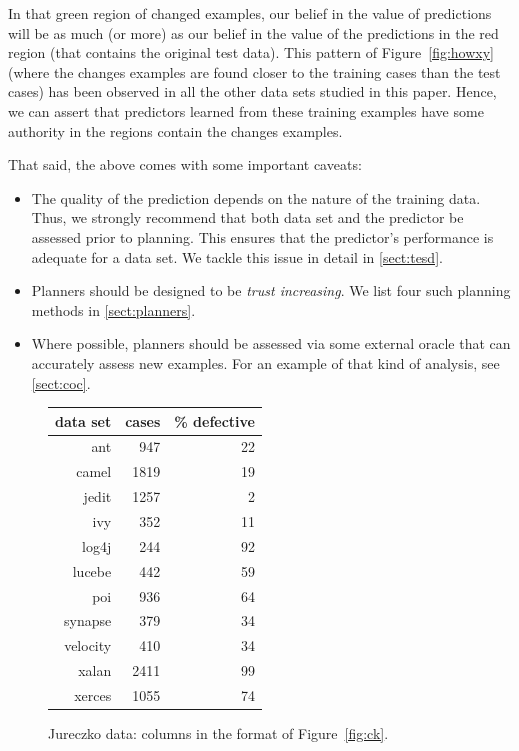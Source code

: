 \documentclass{sig-alternate}
\newcommand{\bi}{\begin{itemize}}
\newcommand{\ei}{\end{itemize}}
\newcommand{\tion}[1]{\textsection\ref{sect:#1}}
\newcommand{\fig}[1]{Figure~\ref{fig:#1}}
\begin{document}
In that green region of changed examples, our belief in the value of predictions
will be as much (or more) as our belief in the value of the predictions in the red region (that
contains the original test data).
This pattern of \fig{howxy} (where the changes examples are found closer to  the training cases than the test cases) has been observed in all the other data sets studied in this
paper. Hence,  we can assert that
predictors learned from these training examples have some authority in the regions
contain the changes examples.


That said, the above comes with some important caveats:
\bi
\item 
The quality of the prediction depends on the nature of the training data. Thus, we strongly recommend that both data set and the predictor be assessed prior to planning. This ensures that the predictor's performance is adequate for a data set. We tackle this issue in detail in \tion{tesd}.
\item
Planners should be designed to be {\em trust increasing}. We list four such planning methods in \tion{planners}.
\item
Where possible, planners should be assessed via some external
oracle that can accurately assess new examples. For an example of that kind of analysis,
see  \tion{coc}.
\ei



  
 \begin{figure}[!t]
 \small
 \begin{center}
 \begin{tabular}{r|rr}
 data set & cases & \% defective\\\hline
  ant &947& 22\\
  camel& 1819& 19\\
 jedit& 1257& 2\\
 ivy &352& 11\\
 log4j& 244 &92\\
 lucebe &442 &59\\
 poi& 936 &64\\
 synapse &379 &34\\
 velocity& 410& 34\\
 xalan& 2411& 99\\
 xerces &1055& 74
 \end{tabular}
 \end{center}
 \caption{ Jureczko data: columns in the format of \fig{ck}.}\label{fig:jd}
 \end{figure}
 
\end{document}

